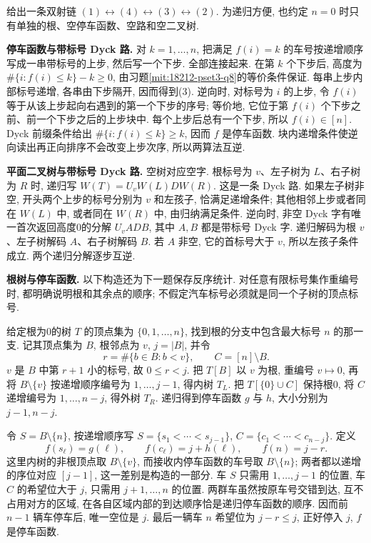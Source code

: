 \begin{solution}
给出一条双射链 $(1)\leftrightarrow(4)\leftrightarrow(3)\leftrightarrow(2)$. 为递归方便, 也约定 $n=0$ 时只有单独的根、空停车函数、空路和空二叉树.

\textbf{停车函数与带标号 Dyck 路.}
对 $k=1,\ldots,n$, 把满足 $f(i)=k$ 的车号按递增顺序写成一串带标号的上步, 然后写一个下步. 全部连接起来. 在第 $k$ 个下步后, 高度为 $\#\{i:f(i)\le k\}-k\ge0$, 由习题\ref{mit:18212-pset3-q8}的等价条件保证. 每串上步内部标号递增, 各串由下步隔开, 因而得到(3). 逆向时, 对标号为 $i$ 的上步, 令 $f(i)$ 等于从该上步起向右遇到的第一个下步的序号; 等价地, 它位于第 $f(i)$ 个下步之前、前一个下步之后的上步块中. 每个上步后总有一个下步, 所以 $f(i)\in[n]$. Dyck 前缀条件给出 $\#\{i:f(i)\le k\}\ge k$, 因而 $f$ 是停车函数. 块内递增条件使逆向读出再正向排序不会改变上步次序, 所以两算法互逆.

\textbf{平面二叉树与带标号 Dyck 路.}
空树对应空字. 根标号为 $v$、左子树为 $L$、右子树为 $R$ 时, 递归写
$W(T)=U_vW(L)DW(R)$. 这是一条 Dyck 路. 如果左子树非空, 开头两个上步的标号分别为 $v$ 和左孩子, 恰满足递增条件; 其他相邻上步或者同在 $W(L)$ 中, 或者同在 $W(R)$ 中, 由归纳满足条件. 逆向时, 非空 Dyck 字有唯一首次返回高度0的分解 $U_v A D B$, 其中 $A,B$ 都是带标号 Dyck 字. 递归解码为根 $v$、左子树解码 $A$、右子树解码 $B$. 若 $A$ 非空, 它的首标号大于 $v$, 所以左孩子条件成立. 两个递归分解逐步互逆.

\textbf{根树与停车函数.}
以下构造还为下一题保存反序统计. 对任意有限标号集作重编号时, 都明确说明根和其余点的顺序; 不假定汽车标号必须就是同一个子树的顶点标号.

给定根为0的树 $T$ 的顶点集为 $\{0,1,\ldots,n\}$, 找到根的分支中包含最大标号 $n$ 的那一支. 记其顶点集为 $B$, 根邻点为 $v$, $j=|B|$, 并令
\[
 r=\#\{b\in B:b<v\},\qquad C=[n]\setminus B.
\]
$v$ 是 $B$ 中第 $r+1$ 小的标号, 故 $0\le r<j$. 把 $T[B]$ 以 $v$ 为根, 重编号 $v\mapsto0$, 再将 $B\setminus\{v\}$ 按递增顺序编号为 $1,\ldots,j-1$, 得内树 $T_L$. 把 $T[\{0\}\cup C]$ 保持根0, 将 $C$ 递增编号为 $1,\ldots,n-j$, 得外树 $T_R$. 递归得到停车函数 $g$ 与 $h$, 大小分别为 $j-1,n-j$.

令 $S=B\setminus\{n\}$, 按递增顺序写 $S=\{s_1<\cdots<s_{j-1}\}$, $C=\{c_1<\cdots<c_{n-j}\}$. 定义
\begin{equation}\label{eq:18212-tree-parking-map}
 f(s_\ell)=g(\ell),\qquad f(c_\ell)=j+h(\ell),\qquad f(n)=j-r.
\end{equation}
这里内树的非根顶点取 $B\setminus\{v\}$, 而接收内停车函数的车号取 $B\setminus\{n\}$; 两者都以递增的序位对应 $[j-1]$, 这一差别是构造的一部分. 车 $S$ 只需用 $1,\ldots,j-1$ 的位置, 车 $C$ 的希望位大于 $j$, 只需用 $j+1,\ldots,n$ 的位置. 两群车虽然按原车号交错到达, 互不占用对方的区域, 在各自区域内部的到达顺序恰是递归停车函数的顺序. 因而前 $n-1$ 辆车停车后, 唯一空位是 $j$. 最后一辆车 $n$ 希望位为 $j-r\le j$, 正好停入 $j$, $f$ 是停车函数.


\end{solution}
